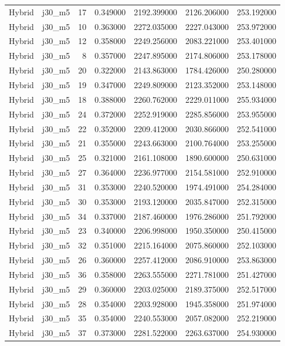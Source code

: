 \begin{tabular}{llrrrrr}
Hybrid & j30_m5 & 17 & 0.349000 & 2192.399000 & 2126.206000 & 253.192000 \\
Hybrid & j30_m5 & 10 & 0.363000 & 2272.035000 & 2227.043000 & 253.972000 \\
Hybrid & j30_m5 & 12 & 0.358000 & 2249.256000 & 2083.221000 & 253.401000 \\
Hybrid & j30_m5 & 8 & 0.357000 & 2247.895000 & 2174.806000 & 253.178000 \\
Hybrid & j30_m5 & 20 & 0.322000 & 2143.863000 & 1784.426000 & 250.280000 \\
Hybrid & j30_m5 & 19 & 0.347000 & 2249.809000 & 2123.352000 & 253.148000 \\
Hybrid & j30_m5 & 18 & 0.388000 & 2260.762000 & 2229.011000 & 255.934000 \\
Hybrid & j30_m5 & 24 & 0.372000 & 2252.919000 & 2285.856000 & 253.955000 \\
Hybrid & j30_m5 & 22 & 0.352000 & 2209.412000 & 2030.866000 & 252.541000 \\
Hybrid & j30_m5 & 21 & 0.355000 & 2243.663000 & 2100.764000 & 253.255000 \\
Hybrid & j30_m5 & 25 & 0.321000 & 2161.108000 & 1890.600000 & 250.631000 \\
Hybrid & j30_m5 & 27 & 0.364000 & 2236.977000 & 2154.581000 & 252.910000 \\
Hybrid & j30_m5 & 31 & 0.353000 & 2240.520000 & 1974.491000 & 254.284000 \\
Hybrid & j30_m5 & 30 & 0.353000 & 2193.120000 & 2035.847000 & 252.315000 \\
Hybrid & j30_m5 & 34 & 0.337000 & 2187.460000 & 1976.286000 & 251.792000 \\
Hybrid & j30_m5 & 23 & 0.340000 & 2206.998000 & 1950.350000 & 250.415000 \\
Hybrid & j30_m5 & 32 & 0.351000 & 2215.164000 & 2075.860000 & 252.103000 \\
Hybrid & j30_m5 & 26 & 0.360000 & 2257.412000 & 2086.910000 & 253.863000 \\
Hybrid & j30_m5 & 36 & 0.358000 & 2263.555000 & 2271.781000 & 251.427000 \\
Hybrid & j30_m5 & 29 & 0.360000 & 2203.025000 & 2189.375000 & 252.517000 \\
Hybrid & j30_m5 & 28 & 0.354000 & 2203.928000 & 1945.358000 & 251.974000 \\
Hybrid & j30_m5 & 35 & 0.354000 & 2240.553000 & 2057.082000 & 252.219000 \\
Hybrid & j30_m5 & 37 & 0.373000 & 2281.522000 & 2263.637000 & 254.930000 \\

\end{tabular}

